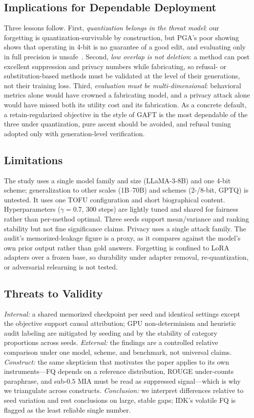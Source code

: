 \documentclass[journal]{IEEEtran}
\begin{document}
\subsection{Implications for Dependable Deployment}
Three lessons follow. First, \emph{quantization belongs in the threat model}: our forgetting is quantization-survivable by construction, but PGA's poor showing shows that operating in 4-bit is no guarantee of a good edit, and evaluating only in full precision is unsafe~\cite{zhang2024quantization}. Second, \emph{low overlap is not deletion}: a method can post excellent suppression and privacy numbers while fabricating, so refusal- or substitution-based methods must be validated at the level of their generations, not their training loss. Third, \emph{evaluation must be multi-dimensional}: behavioral metrics alone would have crowned a fabricating model, and a privacy attack alone would have missed both its utility cost and its fabrication. As a concrete default, a retain-regularized objective in the style of GAFT is the most dependable of the three under quantization, pure ascent should be avoided, and refusal tuning adopted only with generation-level verification.

\subsection{Limitations}
The study uses a single model family and size (LLaMA-3-8B) and one 4-bit scheme; generalization to other scales (1B--70B) and schemes (2-/8-bit, GPTQ) is untested. It uses one TOFU configuration and short biographical content. Hyperparameters ($\gamma=0.7$, 300 steps) are lightly tuned and shared for fairness rather than per-method optimal. Three seeds support mean/variance and ranking stability but not fine significance claims. Privacy uses a single attack family. The audit's memorized-leakage figure is a proxy, as it compares against the model's own prior output rather than gold answers. Forgetting is confined to LoRA adapters over a frozen base, so durability under adapter removal, re-quantization, or adversarial relearning is not tested.

\subsection{Threats to Validity}
\emph{Internal:} a shared memorized checkpoint per seed and identical settings except the objective support causal attribution; GPU non-determinism and heuristic audit labeling are mitigated by seeding and by the stability of category proportions across seeds. \emph{External:} the findings are a controlled relative comparison under one model, scheme, and benchmark, not universal claims. \emph{Construct:} the same skepticism that motivates the paper applies to its own instruments---FQ depends on a reference distribution, ROUGE under-counts paraphrase, and sub-$0.5$ MIA must be read as suppressed signal---which is why we triangulate across constructs. \emph{Conclusion:} we interpret differences relative to seed variation and rest conclusions on large, stable gaps; IDK's volatile FQ is flagged as the least reliable single number.
\end{document}
